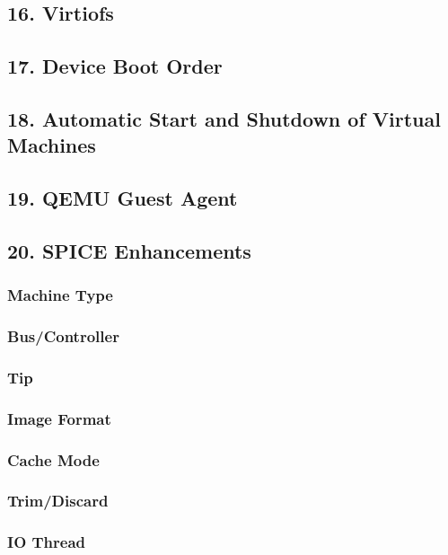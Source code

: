 \subsection{16. Virtiofs}

\subsection{17. Device Boot Order}

\subsection{18. Automatic Start and Shutdown of Virtual Machines}

\subsection{19. QEMU Guest Agent}

\subsection{20. SPICE Enhancements}

\subsubsection{Machine Type}

\subsubsection{Bus/Controller}

\subsubsection{Tip}

\subsubsection{Image Format}

\subsubsection{Cache Mode}

\subsubsection{Trim/Discard}

\subsubsection{IO Thread}

